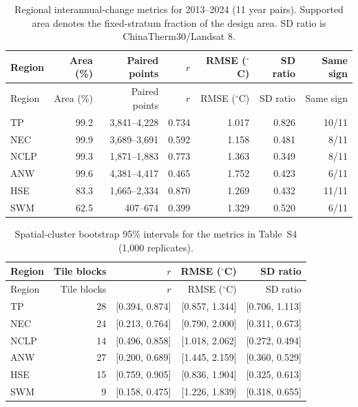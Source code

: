 \begingroup\small\setlength{\tabcolsep}{4pt}
\begin{longtable}{@{}lrrrrrr@{}}
\caption{Regional interannual-change metrics for 2013--2024 (11 year pairs). Supported area denotes the fixed-stratum fraction of the design area. SD ratio is ChinaTherm30/Landsat 8.}\label{tab:s4-interannual-metrics}\\
\toprule
Region & Area (\%) & Paired points & $r$ & RMSE ($^{\circ}$C) & SD ratio & Same sign \\
\midrule
\endfirsthead
\toprule
Region & Area (\%) & Paired points & $r$ & RMSE ($^{\circ}$C) & SD ratio & Same sign \\
\midrule
\endhead
\bottomrule
\endfoot
TP & 99.2 & 3,841--4,228 & 0.734 & 1.017 & 0.826 & 10/11 \\
NEC & 99.9 & 3,689--3,691 & 0.592 & 1.158 & 0.481 & 8/11 \\
NCLP & 99.3 & 1,871--1,883 & 0.773 & 1.363 & 0.349 & 8/11 \\
ANW & 99.6 & 4,381--4,417 & 0.465 & 1.752 & 0.423 & 6/11 \\
HSE & 83.3 & 1,665--2,334 & 0.870 & 1.269 & 0.432 & 11/11 \\
SWM & 62.5 & 407--674 & 0.399 & 1.329 & 0.520 & 6/11 \\
\end{longtable}

\begin{longtable}{@{}lrrrr@{}}
\caption{Spatial-cluster bootstrap 95\% intervals for the metrics in Table~S4 (1,000 replicates).}\label{tab:s5-interannual-ci}\\
\toprule
Region & Tile blocks & $r$ & RMSE ($^{\circ}$C) & SD ratio \\
\midrule
\endfirsthead
\toprule
Region & Tile blocks & $r$ & RMSE ($^{\circ}$C) & SD ratio \\
\midrule
\endhead
\bottomrule
\endfoot
TP & 28 & [0.394, 0.874] & [0.857, 1.344] & [0.706, 1.113] \\
NEC & 24 & [0.213, 0.764] & [0.790, 2.000] & [0.311, 0.673] \\
NCLP & 14 & [0.496, 0.858] & [1.018, 2.062] & [0.272, 0.494] \\
ANW & 27 & [0.200, 0.689] & [1.445, 2.159] & [0.360, 0.529] \\
HSE & 15 & [0.759, 0.905] & [0.836, 1.904] & [0.325, 0.613] \\
SWM & 9 & [0.158, 0.475] & [1.226, 1.839] & [0.318, 0.655] \\
\end{longtable}

